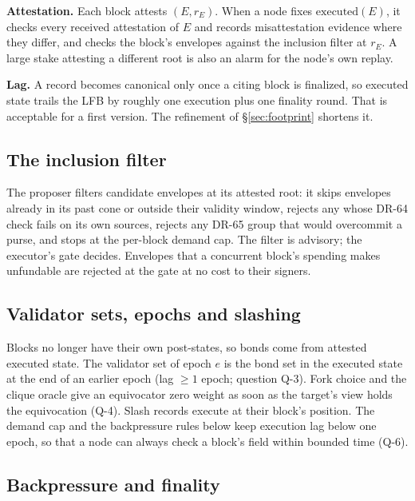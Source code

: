 \documentclass[11pt]{article}
\newcommand{\code}{\path}
\begin{document}
\textbf{Attestation.} Each block attests $(E, r_E)$. When a node fixes $\mathrm{executed}(E)$, it checks every received attestation of $E$ and records misattestation evidence where they differ, and checks the block's envelopes against the inclusion filter at $r_E$. A large stake attesting a different root is also an alarm for the node's own replay.

\textbf{Lag.} A record becomes canonical only once a citing block is finalized, so executed state trails the LFB by roughly one execution plus one finality round. That is acceptable for a first version. The refinement of \S\ref{sec:footprint} shortens it.

\subsection{The inclusion filter}

The proposer filters candidate envelopes at its attested root: it skips envelopes already in its past cone or outside their validity window, rejects any whose DR-64 check fails on its own sources, rejects any DR-65 group that would overcommit a purse, and stops at the per-block demand cap. The filter is advisory; the executor's gate decides. Envelopes that a concurrent block's spending makes unfundable are rejected at the gate at no cost to their signers.

\subsection{Validator sets, epochs and slashing}\label{sec:epochs}

Blocks no longer have their own post-states, so bonds come from attested executed state. The validator set of epoch $e$ is the bond set in the executed state at the end of an earlier epoch (lag $\ge 1$ epoch; question Q-3). Fork choice and the clique oracle give an equivocator zero weight as soon as the target's view holds the equivocation (Q-4). Slash records execute at their block's position. The demand cap and the backpressure rules below keep execution lag below one epoch, so that a node can always check a block's \code{bonds} field within bounded time (Q-6).

\subsection{Backpressure and finality}\label{sec:backpressure}
\end{document}
